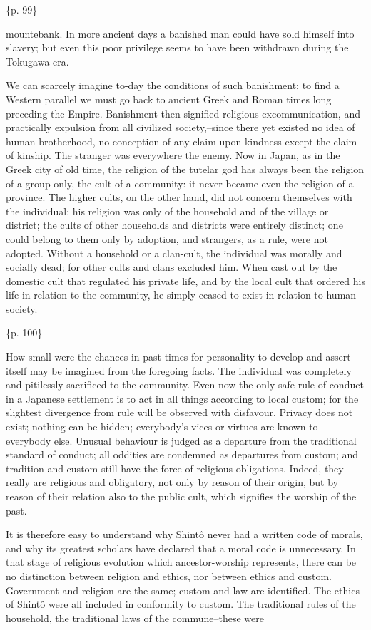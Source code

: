 \{p. 99\}

mountebank. In more ancient days a banished man could have sold himself into slavery; but even this poor privilege seems to have been withdrawn during the Tokugawa era.

We can scarcely imagine to-day the conditions of such banishment: to find a Western parallel we must go back to ancient Greek and Roman times long preceding the Empire. Banishment then signified religious excommunication, and practically expulsion from all civilized society,--since there yet existed no idea of human brotherhood, no conception of any claim upon kindness except the claim of kinship. The stranger was everywhere the enemy. Now in Japan, as in the Greek city of old time, the religion of the tutelar god has always been the religion of a group only, the cult of a community: it never became even the religion of a province. The higher cults, on the other hand, did not concern themselves with the individual: his religion was only of the household and of the village or district; the cults of other households and districts were entirely distinct; one could belong to them only by adoption, and strangers, as a rule, were not adopted. Without a household or a clan-cult, the individual was morally and socially dead; for other cults and clans excluded him. When cast out by the domestic cult that regulated his private life, and by the local cult that ordered his life in relation to the community, he simply ceased to exist in relation to human society.

\{p. 100\}

How small were the chances in past times for personality to develop and assert itself may be imagined from the foregoing facts. The individual was completely and pitilessly sacrificed to the community. Even now the only safe rule of conduct in a Japanese settlement is to act in all things according to local custom; for the slightest divergence from rule will be observed with disfavour. Privacy does not exist; nothing can be hidden; everybody's vices or virtues are known to everybody else. Unusual behaviour is judged as a departure from the traditional standard of conduct; all oddities are condemned as departures from custom; and tradition and custom still have the force of religious obligations. Indeed, they really are religious and obligatory, not only by reason of their origin, but by reason of their relation also to the public cult, which signifies the worship of the past.

It is therefore easy to understand why Shintô never had a written code of morals, and why its greatest scholars have declared that a moral code is unnecessary. In that stage of religious evolution which ancestor-worship represents, there can be no distinction between religion and ethics, nor between ethics and custom. Government and religion are the same; custom and law are identified. The ethics of Shintô were all included in conformity to custom. The traditional rules of the household, the traditional laws of the commune--these were


